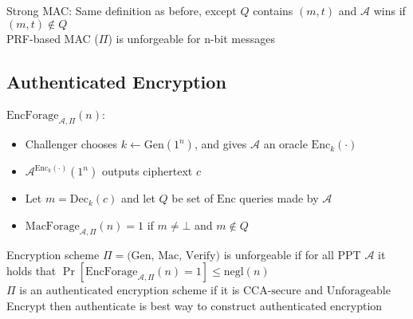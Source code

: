 Strong MAC: Same definition as before, except $Q$ contains $(m,t)$ and $\mathcal{A}$ wins if $(m,t) \notin Q$\\

PRF-based MAC ($\Pi$) is unforgeable for n-bit messages\\

\subsection*{Authenticated Encryption}
$\text{EncForage}_{\mathcal{A},\Pi}(n)$:
\begin{itemize}
    \item Challenger chooses $k\leftarrow \text{Gen}(1^n)$, and gives $\mathcal{A}$ an oracle $\text{Enc}_k(\cdot)$
    \item $\mathcal{A}^{\text{Enc}_k(\cdot)}(1^n)$ outputs ciphertext $c$
    \item Let $m=\text{Dec}_k(c)$ and let $Q$ be set of $\text{Enc}$ queries made by $\mathcal{A}$
    \item $\text{MacForage}_{\mathcal{A},\Pi}(n)=1$ if $m\neq \bot$ and $m\notin Q$
\end{itemize}

Encryption scheme $\Pi = \text{(Gen, Mac, Verify)}$ is unforgeable if for all PPT $\mathcal{A}$ it holds that
$\Pr[\text{EncForage}_{\mathcal{A},\Pi}(n)=1]\le \text{negl}(n)$\\

$\Pi$ is an $\text{authenticated encryption}$ scheme if it is $\text{CCA-secure}$ and $\text{Unforageable}$\\

Encrypt then authenticate is best way to construct authenticated encryption